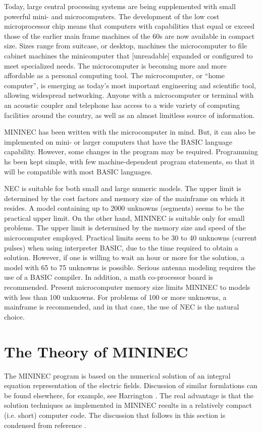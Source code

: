 \documentclass[12pt]{article}
\begin{document}
Today, large central processing systems are being supplemented with
small powerful mini- and microcomputers. The development of the low cost
microprocessor chip means that computers with capabilities that equal or
exceed those of the earlier main frame machines of the 60s are now
available in compact size. Sizes range from suitcase, or desktop,
machines the microcomputer to file cabinet machines the minicomputer
that [unreadable] expanded or configured to meet specialized needs. The
microcomputer is becoming more and more affordable as a personal
computing tool. The microcomputer, or ``home computer'', is emerging as
today's most important engineering and scientific tool, allowing
widespread networking. Anyone with a microcomputer or terminal with an
acoustic coupler and telephone has access to a wide variety of computing
facilities around the country, as well as an almost limitless source of
information.

MININEC has been written with the microcomputer in mind. But, it can
also be implemented on mini- or larger computers that have the BASIC
language capability. However, some changes in the program may be
required. Programming hs been kept simple, with few machine-dependent
program statements, so that it will be compatible with most BASIC
languages.

NEC is suitable for both small and large numeric models. The upper limit
is determined by the cost factors and memory size of the mainframe on
which it resides. A model containing up to 2000 unknowns (segments)
seems to be the practical upper limit. On the other hand, MININEC is
suitable only for small problems. The upper limit is determined by the
memory size and speed of the microcomputer employed. Practical limits
seem to be 30 to 40 unknowns (current pulses) when using interpreter
BASIC, due to the time required to obtain a solution. However, if one is
willing to wait an hour or more for the solution, a model with 65 to 75
unknowns is possible. Serious antenna modeling requires the use of a
BASIC compiler. In addition, a math co-processor board is recommended.
Present microcomputer memory size limits MININEC to models with less
than 100 unknowns. For problems of 100 or more unknowns, a mainframe is
recommended, and in that case, the use of NEC is the natural choice.

\section{The Theory of MININEC}
The MININEC program is based on the numerical solution of an integral
equation representation of the electric fields. Discussion of similar
formlations can be found elsewhere, for example, see Harrington
\cite{r5}. The real advantage is that the solution techniques as
implemented in MININEC results in a relatively compact (i.e. short)
computer code. The discussion that follows in this section is condensed
from reference \cite{r2}.
\end{document}
